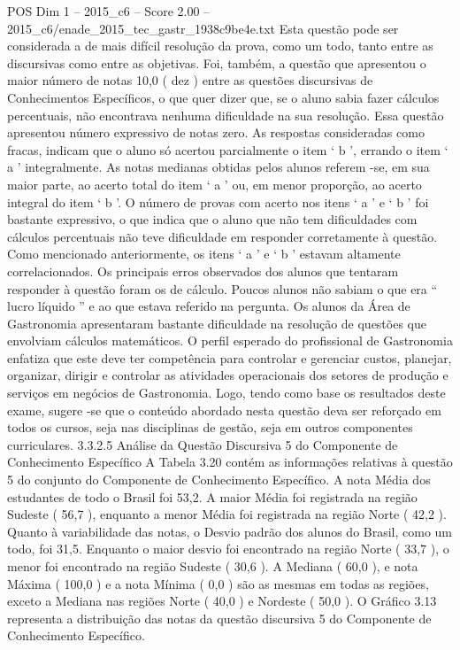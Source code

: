 \begin{textsample}{POS Dim 1 – 2015\_c6 – Score 2.00 – 2015\_c6/enade\_2015\_tec\_gastr\_1938c9be4e.txt}
Esta questão pode ser considerada a de mais difícil resolução da prova, como um todo, tanto entre as discursivas como entre as objetivas.
Foi, também, a questão que apresentou o maior número de notas 10,0 ( dez ) entre as questões discursivas de Conhecimentos Específicos, o que quer dizer que, se o aluno sabia fazer cálculos percentuais, não encontrava nenhuma dificuldade na sua resolução.
Essa questão apresentou número expressivo de notas zero.
As respostas consideradas como fracas, indicam que o aluno só acertou parcialmente o item ‘ b ’, errando o item ‘ a ’ integralmente.
As notas medianas obtidas pelos alunos referem -se, em sua maior parte, ao acerto total do item ‘ a ’ ou, em menor proporção, ao acerto integral do item ‘ b ’.
O número de provas com acerto nos itens ‘ a ’ e ‘ b ’ foi bastante expressivo, o que indica que o aluno que não tem dificuldades com cálculos percentuais não teve dificuldade em responder corretamente à questão.
Como mencionado anteriormente, os itens ‘ a ’ e ‘ b ’ estavam altamente correlacionados.
Os principais erros observados dos alunos que tentaram responder à questão foram os de cálculo.
Poucos alunos não sabiam o que era “ lucro líquido ” e ao que estava referido na pergunta.
Os alunos da Área de Gastronomia apresentaram bastante dificuldade na resolução de questões que envolviam cálculos matemáticos.
O perfil esperado do profissional de Gastronomia enfatiza que este deve ter competência para controlar e gerenciar custos, planejar, organizar, dirigir e controlar as atividades operacionais dos setores de produção e serviços em negócios de Gastronomia.
Logo, tendo como base os resultados deste exame, sugere -se que o conteúdo abordado nesta questão deva ser reforçado em todos os cursos, seja nas disciplinas de gestão, seja em outros componentes curriculares. 3.3.2.5 Análise da Questão Discursiva 5 do Componente de Conhecimento Específico A Tabela 3.20 contém as informações relativas à questão 5 do conjunto do Componente de Conhecimento Específico.
A nota Média dos estudantes de todo o Brasil foi 53,2.
A maior Média foi registrada na região Sudeste ( 56,7 ), enquanto a menor Média foi registrada na região Norte ( 42,2 ).
Quanto à variabilidade das notas, o Desvio padrão dos alunos do Brasil, como um todo, foi 31,5.
Enquanto o maior desvio foi encontrado na região Norte ( 33,7 ), o menor foi encontrado na região Sudeste ( 30,6 ).
A Mediana ( 60,0 ), e nota Máxima ( 100,0 ) e a nota Mínima ( 0,0 ) são as mesmas em todas as regiões, exceto a Mediana nas regiões Norte ( 40,0 ) e Nordeste ( 50,0 ).
O Gráfico 3.13 representa a distribuição das notas da questão discursiva 5 do Componente de Conhecimento Específico.

\end{textsample}
